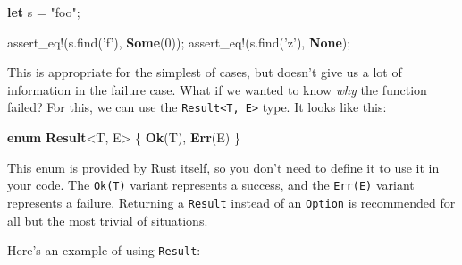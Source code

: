\documentclass[a4paper,]{book}
\newenvironment{Shaded}{\begin{snugshade}}{\end{snugshade}}
\newcommand{\KeywordTok}[1]{\textcolor[rgb]{0.13,0.29,0.53}{\textbf{{#1}}}}
\newcommand{\DecValTok}[1]{\textcolor[rgb]{0.00,0.00,0.81}{{#1}}}
\newcommand{\CharTok}[1]{\textcolor[rgb]{0.31,0.60,0.02}{{#1}}}
\newcommand{\StringTok}[1]{\textcolor[rgb]{0.31,0.60,0.02}{{#1}}}
\newcommand{\OtherTok}[1]{\textcolor[rgb]{0.56,0.35,0.01}{{#1}}}
\newcommand{\NormalTok}[1]{{#1}}
\begin{document}
\begin{Shaded}
\begin{Highlighting}[]
\KeywordTok{let} \NormalTok{s = }\StringTok{"foo"}\NormalTok{;}

\OtherTok{assert_eq!}\NormalTok{(s.find(}\CharTok{'f'}\NormalTok{), }\KeywordTok{Some}\NormalTok{(}\DecValTok{0}\NormalTok{));}
\OtherTok{assert_eq!}\NormalTok{(s.find(}\CharTok{'z'}\NormalTok{), }\KeywordTok{None}\NormalTok{);}
\end{Highlighting}
\end{Shaded}

This is appropriate for the simplest of cases, but doesn't give us a lot
of information in the failure case. What if we wanted to know \emph{why}
the function failed? For this, we can use the
\texttt{Result\textless{}T,\ E\textgreater{}} type. It looks like this:

\begin{Shaded}
\begin{Highlighting}[]
\KeywordTok{enum} \KeywordTok{Result}\NormalTok{<T, E> \{}
   \KeywordTok{Ok}\NormalTok{(T),}
   \KeywordTok{Err}\NormalTok{(E)}
\NormalTok{\}}
\end{Highlighting}
\end{Shaded}

This enum is provided by Rust itself, so you don't need to define it to
use it in your code. The \texttt{Ok(T)} variant represents a success,
and the \texttt{Err(E)} variant represents a failure. Returning a
\texttt{Result} instead of an \texttt{Option} is recommended for all but
the most trivial of situations.

Here's an example of using \texttt{Result}:
\end{document}
